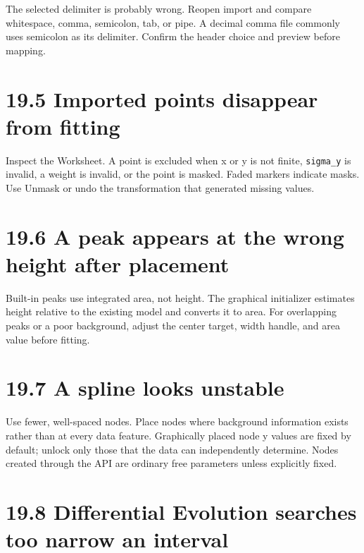 \documentclass[
  10pt,
  a4paper,
  oneside]{scrreprt}
\begin{document}
The selected delimiter is probably wrong. Reopen import and compare
whitespace, comma, semicolon, tab, or pipe. A decimal comma file
commonly uses semicolon as its delimiter. Confirm the header choice and
preview before mapping.

\hypertarget{imported-points-disappear-from-fitting}{%
\section{19.5 Imported points disappear from
fitting}\label{imported-points-disappear-from-fitting}}

Inspect the Worksheet. A point is excluded when x or y is not finite,
\texttt{sigma\_y} is invalid, a weight is invalid, or the point is
masked. Faded markers indicate masks. Use Unmask or undo the
transformation that generated missing values.

\hypertarget{a-peak-appears-at-the-wrong-height-after-placement}{%
\section{19.6 A peak appears at the wrong height after
placement}\label{a-peak-appears-at-the-wrong-height-after-placement}}

Built-in peaks use integrated area, not height. The graphical
initializer estimates height relative to the existing model and converts
it to area. For overlapping peaks or a poor background, adjust the
center target, width handle, and area value before fitting.

\hypertarget{a-spline-looks-unstable}{%
\section{19.7 A spline looks unstable}\label{a-spline-looks-unstable}}

Use fewer, well-spaced nodes. Place nodes where background information
exists rather than at every data feature. Graphically placed node y
values are fixed by default; unlock only those that the data can
independently determine. Nodes created through the API are ordinary free
parameters unless explicitly fixed.

\hypertarget{differential-evolution-searches-too-narrow-an-interval}{%
\section{19.8 Differential Evolution searches too narrow an
interval}\label{differential-evolution-searches-too-narrow-an-interval}}
\end{document}
